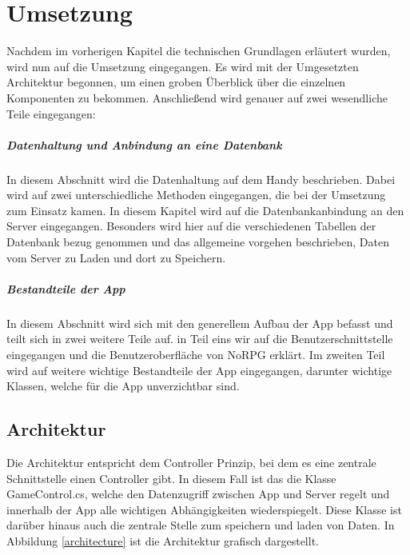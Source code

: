 \chapter{Umsetzung}

	
Nachdem im vorherigen Kapitel die technischen Grundlagen erläutert wurden, wird nun auf die Umsetzung eingegangen. Es wird mit der Umgesetzten Architektur begonnen, um einen groben Überblick über die einzelnen Komponenten zu bekommen. Anschließend wird genauer auf zwei wesendliche Teile eingegangen:
	
\paragraph{Datenhaltung und Anbindung an eine Datenbank}
In diesem Abschnitt wird die Datenhaltung auf dem Handy beschrieben. Dabei wird auf zwei unterschiedliche Methoden eingegangen, die bei der Umsetzung zum Einsatz kamen.
In diesem Kapitel wird auf die Datenbankanbindung an den Server eingegangen. Besonders wird hier auf die verschiedenen Tabellen der Datenbank bezug genommen und das allgemeine vorgehen beschrieben, Daten vom Server zu Laden und dort zu Speichern.
		
\paragraph{Bestandteile der App}
In diesem Abschnitt wird sich mit den generellem Aufbau der App befasst und teilt sich in zwei weitere Teile auf. in Teil eins wir auf die Benutzerschnittstelle eingegangen und die Benutzeroberfläche von NoRPG erklärt. Im zweiten Teil wird auf weitere wichtige Bestandteile der App eingegangen, darunter wichtige Klassen, welche für die App unverzichtbar sind.
	
\section{Architektur}
	
Die Architektur entspricht dem Controller Prinzip, bei dem es eine zentrale Schnittstelle einen Controller gibt. In diesem Fall ist das die Klasse GameControl.cs, welche den Datenzugriff
zwischen App und Server regelt und innerhalb der App alle wichtigen Abhängigkeiten wiederspiegelt. Diese Klasse ist darüber hinaus auch die zentrale Stelle zum speichern und laden von Daten. In Abbildung \ref{architecture} ist die Architektur grafisch dargestellt.


